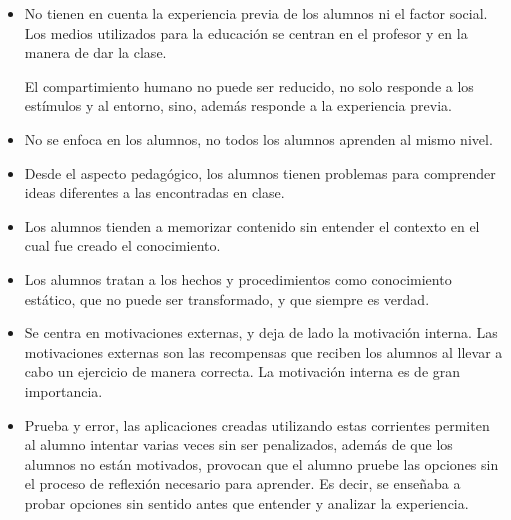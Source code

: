 \begin{itemize}

\item No tienen en cuenta la experiencia previa de los alumnos ni el factor
    social. Los medios utilizados para la educación se centran en el profesor y
    en la manera de dar la clase\cite{siemens2008learning,sawyer2005cambridge}.

    El compartimiento humano no puede ser reducido, no solo responde a los
    estímulos y al entorno, sino, además responde a la experiencia
    previa\cite{weegar2012comparison}.

\item No se enfoca en los alumnos, no todos los alumnos aprenden al mismo
    nivel\cite{johnson2005instructionism}.

\item Desde el aspecto pedagógico, los alumnos tienen problemas para comprender
    ideas diferentes a las encontradas en clase\cite{sawyer2005cambridge}.

\item Los alumnos tienden a memorizar contenido sin entender el contexto en el
    cual fue creado el conocimiento\cite{sawyer2005cambridge}. 
    
\item Los alumnos tratan a los hechos y procedimientos como conocimiento
    estático, que no puede ser transformado, y que siempre es
    verdad\cite{sawyer2005cambridge}.

\item Se centra en motivaciones externas, y deja de lado la motivación interna.
    Las motivaciones externas son las recompensas que reciben los alumnos al
    llevar a cabo un ejercicio de manera correcta. La motivación interna es de
    gran importancia\cite{weegar2012comparison}.
    
\item Prueba y error, las aplicaciones creadas utilizando estas corrientes
    permiten al alumno intentar varias veces sin ser penalizados, además de que
    los alumnos no están motivados, provocan que el alumno pruebe las opciones
    sin el proceso de reflexión necesario para aprender. Es decir, se enseñaba a
    probar opciones sin sentido antes que entender y analizar la
    experiencia\cite{charsky:2010,egenfeldt2007third,bruckman1999can}.

\end{itemize}

